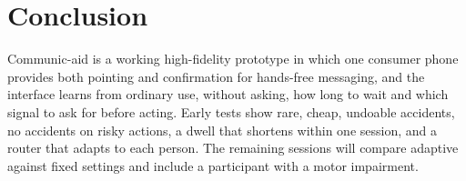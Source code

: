 \documentclass[manuscript,review]{acmart}
\begin{document}
\section{Conclusion}

Communic-aid is a working high-fidelity prototype in which one consumer phone provides both
pointing and confirmation for hands-free messaging, and the interface learns from ordinary use,
without asking, how long to wait and which signal to ask for before acting. Early tests show rare,
cheap, undoable accidents, no accidents on risky actions, a dwell that shortens within one session,
and a router that adapts to each person. The remaining sessions will compare adaptive against fixed
settings and include a participant with a motor impairment.



\end{document}
